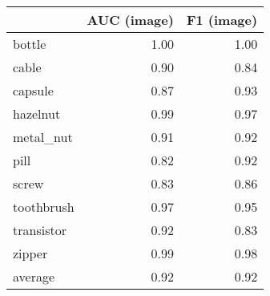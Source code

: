 \begin{tabular}{lrr}
\toprule
{} &  AUC (image) &  F1 (image) \\
\midrule
bottle     &         1.00 &        1.00 \\
cable      &         0.90 &        0.84 \\
capsule    &         0.87 &        0.93 \\
hazelnut   &         0.99 &        0.97 \\
metal\_nut  &         0.91 &        0.92 \\
pill       &         0.82 &        0.92 \\
screw      &         0.83 &        0.86 \\
toothbrush &         0.97 &        0.95 \\
transistor &         0.92 &        0.83 \\
zipper     &         0.99 &        0.98 \\
average    &         0.92 &        0.92 \\
\bottomrule
\end{tabular}
